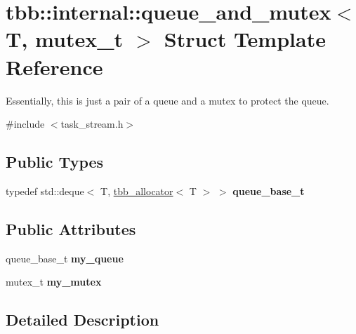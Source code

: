 \hypertarget{structtbb_1_1internal_1_1queue__and__mutex}{}\section{tbb\+:\+:internal\+:\+:queue\+\_\+and\+\_\+mutex$<$ T, mutex\+\_\+t $>$ Struct Template Reference}
\label{structtbb_1_1internal_1_1queue__and__mutex}


Essentially, this is just a pair of a queue and a mutex to protect the queue.  




{\ttfamily \#include $<$task\+\_\+stream.\+h$>$}

\subsection*{Public Types}
\begin{DoxyCompactItemize}
\item 
\hypertarget{structtbb_1_1internal_1_1queue__and__mutex_a2ab80dbe8e1ff5c80e3171a07bead220}{}typedef std\+::deque$<$ T, \hyperlink{classtbb_1_1tbb__allocator}{tbb\+\_\+allocator}$<$ T $>$ $>$ {\bfseries queue\+\_\+base\+\_\+t}\label{structtbb_1_1internal_1_1queue__and__mutex_a2ab80dbe8e1ff5c80e3171a07bead220}

\end{DoxyCompactItemize}
\subsection*{Public Attributes}
\begin{DoxyCompactItemize}
\item 
\hypertarget{structtbb_1_1internal_1_1queue__and__mutex_a09596e303907f8a384b966261d12a2f1}{}queue\+\_\+base\+\_\+t {\bfseries my\+\_\+queue}\label{structtbb_1_1internal_1_1queue__and__mutex_a09596e303907f8a384b966261d12a2f1}

\item 
\hypertarget{structtbb_1_1internal_1_1queue__and__mutex_a31f3d070e6f466978dbf835a9e2fee5a}{}mutex\+\_\+t {\bfseries my\+\_\+mutex}\label{structtbb_1_1internal_1_1queue__and__mutex_a31f3d070e6f466978dbf835a9e2fee5a}

\end{DoxyCompactItemize}


\subsection{Detailed Description}
